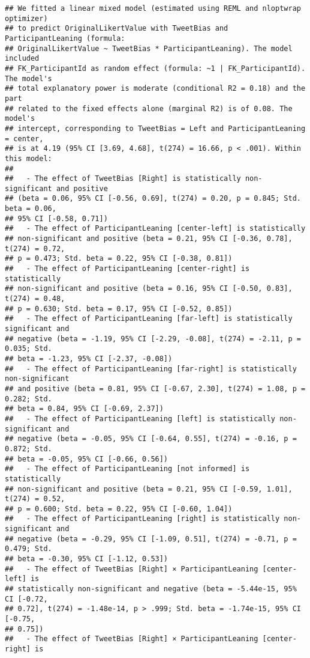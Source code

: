 \documentclass[
]{article}
\begin{document}
\begin{verbatim}
## We fitted a linear mixed model (estimated using REML and nloptwrap optimizer)
## to predict OriginalLikertValue with TweetBias and ParticipantLeaning (formula:
## OriginalLikertValue ~ TweetBias * ParticipantLeaning). The model included
## FK_ParticipantId as random effect (formula: ~1 | FK_ParticipantId). The model's
## total explanatory power is moderate (conditional R2 = 0.18) and the part
## related to the fixed effects alone (marginal R2) is of 0.08. The model's
## intercept, corresponding to TweetBias = Left and ParticipantLeaning = center,
## is at 4.19 (95% CI [3.69, 4.68], t(274) = 16.66, p < .001). Within this model:
## 
##   - The effect of TweetBias [Right] is statistically non-significant and positive
## (beta = 0.06, 95% CI [-0.56, 0.69], t(274) = 0.20, p = 0.845; Std. beta = 0.06,
## 95% CI [-0.58, 0.71])
##   - The effect of ParticipantLeaning [center-left] is statistically
## non-significant and positive (beta = 0.21, 95% CI [-0.36, 0.78], t(274) = 0.72,
## p = 0.473; Std. beta = 0.22, 95% CI [-0.38, 0.81])
##   - The effect of ParticipantLeaning [center-right] is statistically
## non-significant and positive (beta = 0.16, 95% CI [-0.50, 0.83], t(274) = 0.48,
## p = 0.630; Std. beta = 0.17, 95% CI [-0.52, 0.85])
##   - The effect of ParticipantLeaning [far-left] is statistically significant and
## negative (beta = -1.19, 95% CI [-2.29, -0.08], t(274) = -2.11, p = 0.035; Std.
## beta = -1.23, 95% CI [-2.37, -0.08])
##   - The effect of ParticipantLeaning [far-right] is statistically non-significant
## and positive (beta = 0.81, 95% CI [-0.67, 2.30], t(274) = 1.08, p = 0.282; Std.
## beta = 0.84, 95% CI [-0.69, 2.37])
##   - The effect of ParticipantLeaning [left] is statistically non-significant and
## negative (beta = -0.05, 95% CI [-0.64, 0.55], t(274) = -0.16, p = 0.872; Std.
## beta = -0.05, 95% CI [-0.66, 0.56])
##   - The effect of ParticipantLeaning [not informed] is statistically
## non-significant and positive (beta = 0.21, 95% CI [-0.59, 1.01], t(274) = 0.52,
## p = 0.600; Std. beta = 0.22, 95% CI [-0.60, 1.04])
##   - The effect of ParticipantLeaning [right] is statistically non-significant and
## negative (beta = -0.29, 95% CI [-1.09, 0.51], t(274) = -0.71, p = 0.479; Std.
## beta = -0.30, 95% CI [-1.12, 0.53])
##   - The effect of TweetBias [Right] × ParticipantLeaning [center-left] is
## statistically non-significant and negative (beta = -5.44e-15, 95% CI [-0.72,
## 0.72], t(274) = -1.48e-14, p > .999; Std. beta = -1.74e-15, 95% CI [-0.75,
## 0.75])
##   - The effect of TweetBias [Right] × ParticipantLeaning [center-right] is

\end{verbatim}
\end{document}
